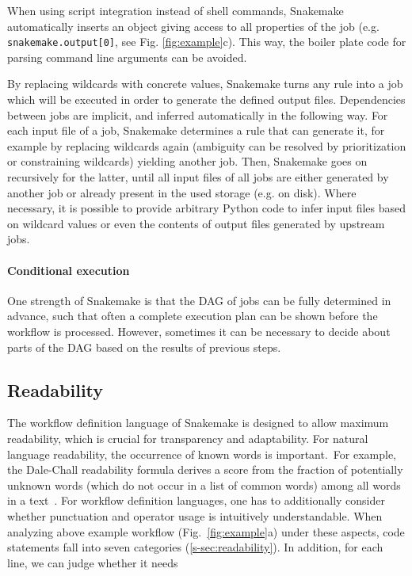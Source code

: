 \documentclass[parskip=half]{scrartcl}
\begin{document}
When using script integration instead of shell commands, Snakemake automatically inserts an object giving access to all properties of the job (e.g. \lstinline!snakemake.output[0]!, see Fig.
\ref{fig:example}c).
This way, the boiler plate code for parsing command line arguments can be avoided.

By replacing wildcards with concrete values, Snakemake turns any rule into a job which will be executed in order to generate the defined output files.
Dependencies between jobs are implicit, and inferred automatically in the following way.
For each input file of a job, Snakemake determines a rule that can generate it, for example by replacing wildcards again (ambiguity can be resolved by prioritization or constraining wildcards) yielding another job.
Then, Snakemake goes on recursively for the latter, until all input files of all jobs are either generated by another job or already present in the used storage (e.g. on disk).
Where necessary, it is possible to provide arbitrary Python code to infer input files based on wildcard values or even the contents of output files generated by upstream jobs.

\paragraph{Conditional execution}
One strength of Snakemake is that the DAG of jobs can be fully determined in advance, such that often a complete execution plan can be shown before the workflow is processed.
However, sometimes it can be necessary to decide about parts of the DAG based on the results of previous steps.

\subsection{Readability}

The workflow definition language of Snakemake is designed to allow maximum readability, which is crucial for transparency and adaptability.
For natural language readability, the occurrence of known words is important.~For example, the Dale-Chall readability formula derives a score from the fraction of potentially unknown words (which do not occur in a list of common words) among all words in a text~\parencite{chall_readability_1995}.
For workflow definition languages, one has to additionally consider whether punctuation and operator usage is intuitively understandable.
When analyzing above example workflow (Fig.~\ref{fig:example}a) under these aspects, code statements fall into seven categories (\autoref{s-sec:readability}).
In addition, for each line, we can judge whether it needs 
\end{document}
